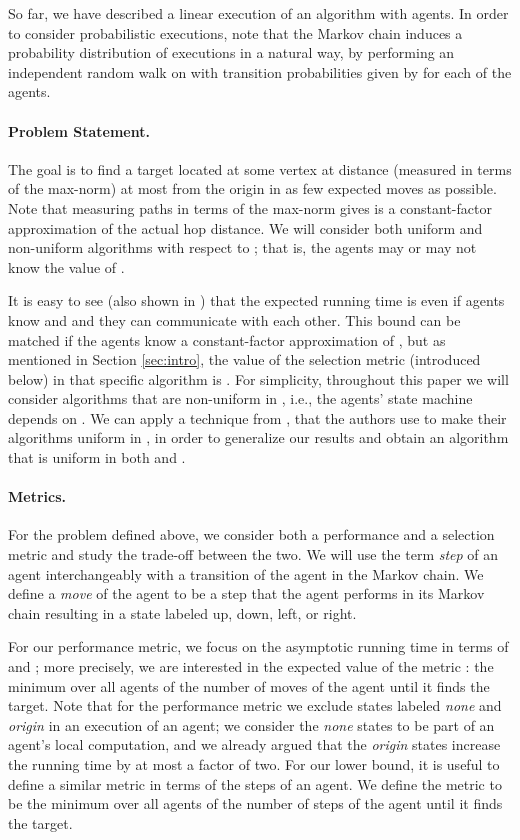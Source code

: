 \documentclass[11pt]{article}
\begin{document}
So far, we have described a linear execution of an algorithm with  agents. In order to consider probabilistic executions, note that the Markov chain  induces a probability distribution of executions in a natural way, by performing an independent random walk on  with transition probabilities given by  for each of the  agents.

\paragraph{Problem Statement.}
The goal is to find a target located at some vertex at distance (measured in terms of the max-norm) at most  from the origin in as few expected moves as possible. Note that measuring paths in terms of the max-norm gives is a constant-factor approximation of the actual hop distance. We will consider both uniform and non-uniform algorithms with respect to ; that is, the agents may or may not know the value of . 

It is easy to see (also shown in \cite{feinerman12podc}) that the expected running time is  even if agents know  and  and they can communicate with each other. This bound can be matched if the agents know a constant-factor approximation of  \cite{feinerman12podc}, but as mentioned in Section \ref{sec:intro}, the value of the selection metric  (introduced below) in that specific algorithm is . For simplicity, throughout this paper we will consider algorithms that are non-uniform in , i.e., the agents' state machine depends on . We can apply a technique from \cite{feinerman12podc}, that the authors use to make their algorithms uniform in , in order to generalize our results and obtain an algorithm that is uniform in both  and .


\paragraph{Metrics. } For the problem defined above, we consider both a performance and a selection metric and study the trade-off between the two. 
We will use the term \emph{step} of an agent interchangeably with a transition of the agent in the Markov chain. We define a \emph{move} of the agent to be a step that the agent performs in its Markov chain resulting in a state labeled up, down, left, or right. 

For our performance metric, we focus on the asymptotic running time in terms of  and ; more precisely, we are interested in the expected value of the metric : the minimum over all agents of the number of moves of the agent until it finds the target. Note that for the performance metric we exclude states labeled \emph{none} and \emph{origin} in an execution of an agent; we consider the \emph{none} states to be part of an agent's local computation, and we already argued that the \emph{origin} states increase the running time by at most a factor of two. For our lower bound, it is useful to define a similar metric in terms of the steps of an agent. We define the metric  to be the minimum over all agents of the number of steps of the agent until it finds the target.
\end{document}
